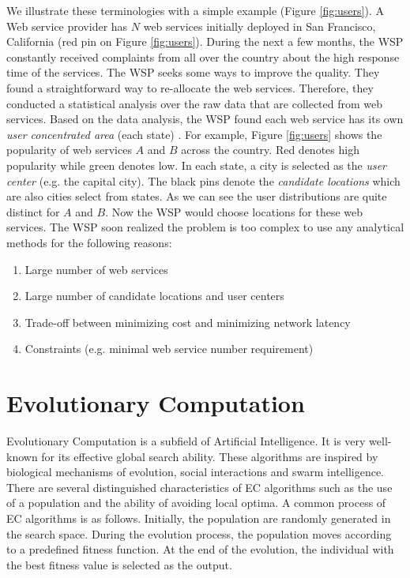 We illustrate these terminologies with a simple example (Figure \ref{fig:users}). 
A Web service provider has $N$ web services initially deployed in San Francisco, California (red pin on Figure \ref{fig:users}). During the next a few months, the WSP constantly received complaints
from all over the country about the high response time of the services. The WSP seeks some ways to improve the quality. They found a straightforward
way to re-allocate the web services. Therefore, they conducted a statistical analysis over the 
raw data that are collected from web services. Based on the data analysis, the WSP found each web service has its own \emph{user concentrated area} (each state) . 
For example, Figure \ref{fig:users} shows the popularity of web services $A$ and $B$ across the country.
Red denotes high popularity while green denotes low. In each state, a city is selected as the \emph{user center} (e.g. the capital city).
The black pins denote the \emph{candidate locations} which are also cities select from states. 
As we can see the user distributions are quite distinct for $A$ and $B$. Now the WSP would choose locations for these web services.
The WSP soon realized the problem is too complex to use any analytical methods for the following reasons:
\begin{enumerate}
 \item Large number of web services
 \item Large number of candidate locations and user centers
 \item Trade-off between minimizing cost and minimizing network latency
 \item Constraints (e.g. minimal web service number requirement)
\end{enumerate}




\section{Evolutionary Computation}
Evolutionary Computation is a subfield of Artificial Intelligence. It is very well-known for its effective global search ability. These algorithms are 
inspired by biological mechanisms of evolution, social interactions and swarm intelligence. 
There are several distinguished characteristics of EC algorithms such
as the use of a population and the ability of avoiding local optima. 
A common process of EC algorithms is as follows. Initially, the population are randomly generated in the search space. During the evolution process, the population
moves according to a predefined fitness function. At the end of the evolution, the individual with the best fitness value is selected as the output.

